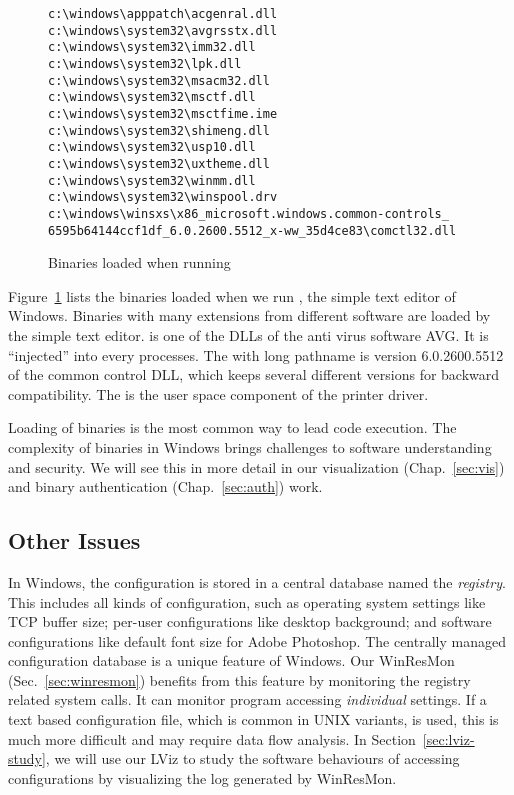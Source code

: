 \begin{figure}[htb]
\small
\begin{verbatim}
c:\windows\apppatch\acgenral.dll
c:\windows\system32\avgrsstx.dll
c:\windows\system32\imm32.dll
c:\windows\system32\lpk.dll
c:\windows\system32\msacm32.dll
c:\windows\system32\msctf.dll
c:\windows\system32\msctfime.ime
c:\windows\system32\shimeng.dll
c:\windows\system32\usp10.dll
c:\windows\system32\uxtheme.dll
c:\windows\system32\winmm.dll
c:\windows\system32\winspool.drv
c:\windows\winsxs\x86_microsoft.windows.common-controls_
6595b64144ccf1df_6.0.2600.5512_x-ww_35d4ce83\comctl32.dll
\end{verbatim}
\caption{Binaries loaded when running }
\label{fig:notepad-bin}
\end{figure}

Figure~\ref{fig:notepad-bin} lists the binaries loaded when we run
, the simple text editor of Windows.
Binaries with many extensions from different software
are loaded by the simple text editor.
 is one of the DLLs of the anti virus software AVG.
It is ``injected'' into every processes.
The  with long pathname is version 6.0.2600.5512 of
the common control DLL, which keeps several different versions
for backward compatibility. 
The  is the user space component of the printer
driver.

Loading of binaries is the most common way to lead code execution.
The complexity of binaries in Windows brings challenges to software understanding
and security.
We will see this in more detail in our visualization
(Chap.~\ref{sec:vis}) and binary authentication (Chap.~\ref{sec:auth}) work.

\subsection{Other Issues}

In Windows, the configuration is stored in a central database named the
{\em registry}.
This includes all kinds of configuration, such as
operating system settings like TCP buffer size;
per-user configurations like desktop background;
and software configurations like default font size
for Adobe Photoshop.
The centrally managed configuration database is
a unique feature of Windows.
Our WinResMon (Sec.~\ref{sec:winresmon}) benefits from this feature
by monitoring the registry related system calls.
It can monitor program accessing {\em individual} settings.
If a text based configuration file,
which is common in UNIX variants, is used, this is much more difficult
and may require data flow analysis.
In Section~\ref{sec:lviz-study}, we will use our LViz to study the
software behaviours of accessing configurations by visualizing the
log generated by WinResMon.

